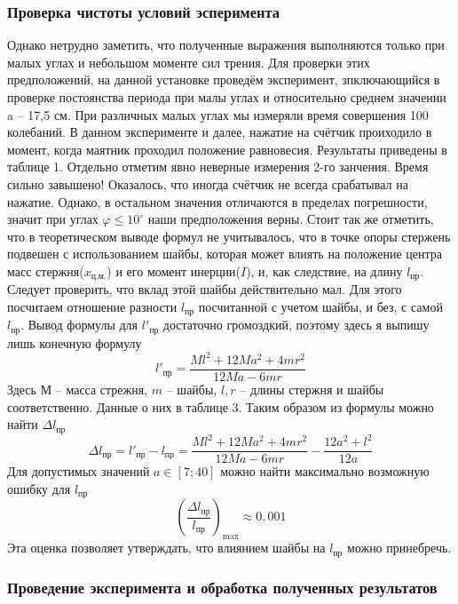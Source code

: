 \documentclass[a4paper, 10pt]{article}%
\begin{document}
\subsubsection*{Проверка чистоты условий эсперимента}
Однако нетрудно заметить, что полученные выражения выполняются только при малых углах и небольшом моменте сил трения. Для проверки этих предположений, на данной установке проведём эксперимент, зпключающийся в проверке постоянства периода при малы углах и относительно среднем значении a -- 17,5 см. При различных малых углах мы измеряли время совершения 100 колебаний. В данном эксперименте и далее, нажатие на счётчик проиходило в момент, когда маятник проходил положение равновесия. Результаты приведены в таблице 1. Отдельно отметим явно неверные измерения 2-го занчения. Время сильно завышено! Оказалось, что иногда счётчик не всегда срабатывал на нажатие. Однако, в остальном значения отличаются в пределах погрешности, значит при углах $\varphi\leq10^{\circ}$ наши предположения верны.
Стоит так же отметить, что в теоретическом выводе формул не учитывалось, что в точке опоры стержень подвешен с использованием шайбы, которая может влиять на положение центра масс стержня($x_{\text{ц.м.}}$) и его момент инерции($I$), и, как следствие, на длину $l_{\text{пр}}$. Следует проверить, что вклад этой шайбы действительно мал. Для этого посчитаем отношение разности $l_{\text{пр}}$ посчитанной с учетом шайбы, и без, с самой $l_{\text{пр}}$. Вывод формулы для $l'_{\text{пр}}$ достаточно громоздкий, поэтому здесь я выпишу лишь конечную формулу
\begin{equation}
l'_{\text{пр}}=\dfrac{Ml^2+12Ma^2+4mr^2}{12Ma-6mr}
\end{equation}
Здесь $М$ -- масса стрежня, $m$ -- шайбы, $l, r$ -- длины стержня и шайбы соответственно. Данные о них в таблице 3.
Таким образом из формулы можно найти $\Delta l_{\text{пр}}$ 
\[\Delta l_{\text{пр}}=l'_{\text{пр}}-l_{\text{пр}}=\dfrac{Ml^2+12Ma^2+4mr^2}{12Ma-6mr}-\dfrac{12a^2+l^2}{12a}\]
Для допустимых значений $a\in [7;40]$ можно найти максимально возможную ошибку для $l_{\text{пр}}$
\begin{equation}
\left(\frac{\Delta l_{\text{пр}}}{l_{\text{пр}}}\right)_{\text{max}}\approx 0,001 
\end{equation}
Эта оценка позволяет утверждать, что влиянием шайбы на $l_{\text{пр}}$ можно принебречь.
\subsubsection*{Проведение эксперимента и обработка полученных результатов}
\end{document}
